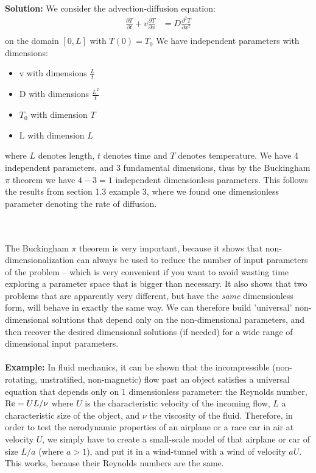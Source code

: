 \\
\\
{\color{red} {\bf Solution:}
We consider the advection-diffusion equation: 
\begin{align*}
    \frac{\partial T}{\partial t} + v \frac{\partial T}{\partial x} &= D \frac{\partial ^2 T}{\partial x ^2}    \\
\end{align*}
on the domain $[0, L]$ with $T(0) = T_0$
We have independent parameters with dimensions: 
\begin{itemize}
    \item v with dimensions $\frac{L}{t}$\\
    \item D with dimensions $\frac{L^2}{t}$\\
    \item $T_0$ with dimension $T$\\
    \item L with dimension $L$
\end{itemize}
where $L$ denotes length, $t$ denotes time and $T$ denotes temperature. We have 4 independent parameters, and 3 fundamental dimensions, thus by the Buckingham $\pi$ theorem we have $4 - 3 = 1$ independent dimensionless parameters. This follows the results from section 1.3 example 3, where we found one dimensionless parameter denoting the rate of diffusion. 
}

\\
\\
The Buckingham $\pi$ theorem is very important, because it shows that non-dimensionalization can always be used to reduce the number of input parameters of the problem -- which is very convenient if you want to avoid wasting time exploring a parameter space that is bigger than necessary. It also shows that two problems that are apparently very different, but have the {\it same} dimensionless form, will behave in exactly the same way. We can therefore build 'universal' non-dimensional solutions that depend only on the non-dimensional parameters, and then recover the desired dimensional solutions (if needed) for a wide range of dimensional input parameters. 
\\
\\
{\bf Example:} In fluid mechanics, it can be shown that the incompressible (non-rotating, unstratified, non-magnetic) flow past an object satisfies a universal equation that depends only on 1 dimensionless parameter: the Reynolds number, ${\rm Re} = UL/\nu$ where $U$ is the characteristic velocity of the incoming flow, $L$ a characteristic size of the object, and $\nu$ the viscosity of the fluid. Therefore, in order to test the aerodynamic properties of an airplane or a race car in air at velocity $U$, we simply have to create a small-scale model of that airplane or car of size $L/a$ (where $a >1$), and put it in a wind-tunnel with a wind of velocity $aU$. This works, because their Reynolds numbers are the same.   

